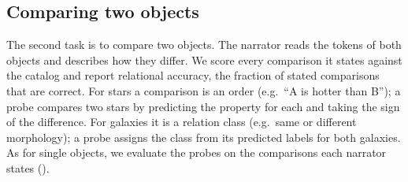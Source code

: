 \subsection{Comparing two objects}\label{sec:pairs}
The second task is to compare two objects. The narrator reads the tokens of both objects and
describes how they differ. We score every comparison it states against the catalog and report
relational accuracy, the fraction of stated comparisons that are correct. For stars a
comparison is an order (e.g.\ ``A is hotter than B''); a probe compares two stars by predicting
the property for each and taking the sign of the difference. For galaxies it is a relation
class (e.g.\ same or different morphology); a probe assigns the class from its predicted labels
for both galaxies. As for single objects, we evaluate the probes on the comparisons each narrator
states ().

